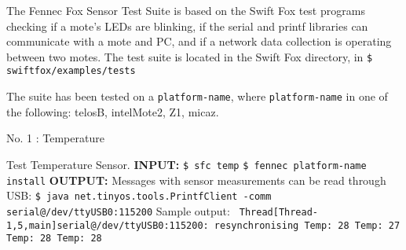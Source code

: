 \documentclass[11pt]{article}
\begin{document}
\vfill





The Fennec Fox Sensor Test Suite is based on the Swift Fox test programs
checking if a mote's LEDs are blinking, if the serial and printf libraries
can communicate with a mote and PC, and if a network data collection is 
operating between two motes. The test suite is located in the Swift Fox
directory, in \texttt{\$ swiftfox/examples/tests}

The suite has been tested on a \texttt{platform-name}, where 
\texttt{platform-name} in one of the following: telosB, intelMote2, Z1, micaz.

\newpage

\begin{center}
{\large No. 1 : Temperature} 	
\end{center}
\vspace{1cm}
	Test Temperature Sensor. \newline
	\textbf{INPUT:}\newline
	\texttt{\$ sfc temp} \newline
	\texttt{\$ fennec \texttt{platform-name} install}\newline
	\textbf{OUTPUT:}\newline
	Messages with sensor measurements can be read through USB: \newline
	\texttt{\$ java net.tinyos.tools.PrintfClient -comm serial@/dev/ttyUSB0:115200} \newline
	Sample output:
	\texttt{\scriptsize 
		Thread[Thread-1,5,main]serial@/dev/ttyUSB0:115200: resynchronising\newline
		Temp: 28\newline
		Temp: 27\newline
		Temp: 28\newline
		Temp: 28\newline
	}

\vspace{1cm}
\newpage
\end{document}
